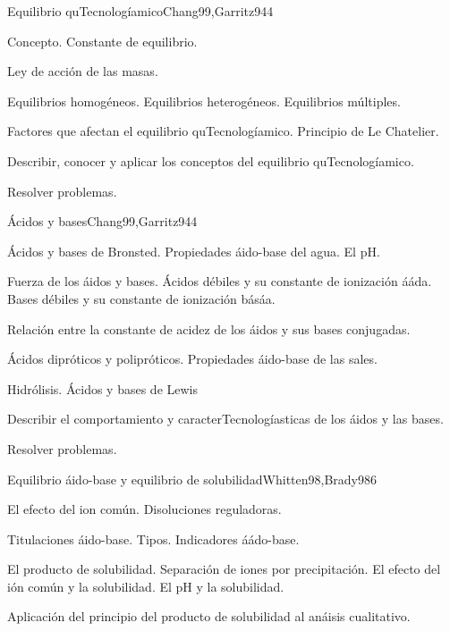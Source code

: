 \begin{syllabus}
\begin{unit}{Equilibrio quTecnologíamico}{Chang99,Garritz94}{4}
\begin{topics}
      \item Concepto. Constante de equilibrio.
      \item Ley de acción de las masas.
      \item Equilibrios homogéneos. Equilibrios heterogéneos. Equilibrios múltiples.
      \item Factores que afectan el equilibrio quTecnologíamico. Principio de Le Chatelier.
    \end{topics}
   \begin{unitgoals}
      \item Describir, conocer y aplicar los conceptos del equilibrio quTecnologíamico.
      \item Resolver problemas.
   \end{unitgoals}
\end{unit}

\begin{unit}{Ácidos y bases}{Chang99,Garritz94}{4}
\begin{topics}
	\item Ácidos y bases de Bronsted. Propiedades áido-base del agua. El pH.
	\item Fuerza de los áidos y bases. Ácidos débiles y su constante de ionización ááda. Bases débiles y su constante de ionización básáa. 
	\item Relación entre la constante de acidez de los áidos y sus bases conjugadas.
	\item Ácidos dipróticos y polipróticos. Propiedades áido-base de las sales.
	\item Hidrólisis.  Ácidos y bases de Lewis
\end{topics}

\begin{unitgoals}
	\item Describir el comportamiento y caracterTecnologíasticas de los áidos y las bases.
	\item Resolver problemas.
\end{unitgoals}
\end{unit}

\begin{unit}{Equilibrio áido-base y equilibrio de solubilidad}{Whitten98,Brady98}{6}
\begin{topics}
	\item El efecto del ion común. Disoluciones reguladoras.
	\item Titulaciones áido-base. Tipos.  Indicadores áádo-base.
	\item El producto de solubilidad. Separación de iones por precipitación. El efecto del ión común y la solubilidad. El pH y la solubilidad.
	\item Aplicación del principio del producto de solubilidad al anáisis cualitativo.
\end{topics}


\end{unit}
\end{syllabus}
